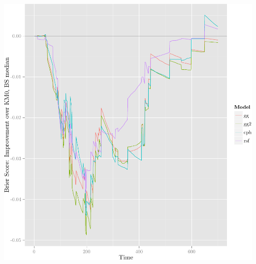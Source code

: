 \documentclass{article}\usepackage[]{graphicx}\usepackage[]{color}
\makeatletter
\def\maxwidth{ %
  \ifdim\Gin@nat@width>\linewidth
    \linewidth
  \else
    \Gin@nat@width
  \fi
}
\newenvironment{knitrout}{}{} %
\makeatother
\begin{document}
\begin{knitrout}
{\centering \includegraphics[width=\maxwidth]{figure/05-model-selection-bs-paths-6} 

}



\end{knitrout}
\end{document}
